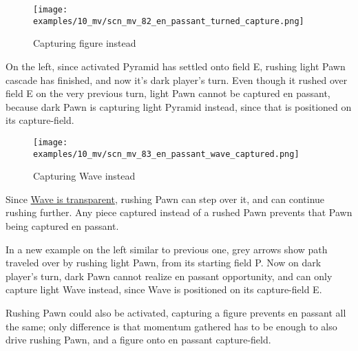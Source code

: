 \clearpage %

\vspace*{-2.1\baselineskip}
\noindent
\begin{wrapfigure}[11]{l}{0.4\textwidth}
\centering
\texttt{[image: examples/10\_mv/scn\_mv\_82\_en\_passant\_turned\_capture.png]}
\vspace*{-1.4\baselineskip}
\caption{Capturing figure instead}
\label{fig:scn_mv_82_en_passant_turned_capture}
\end{wrapfigure}
On the left, since activated Pyramid has settled onto field E, rushing light Pawn
cascade has finished, and now it's dark player's turn.\newline
\indent
Even though it rushed over field E on the very previous turn, light Pawn cannot
be captured en passant, because dark Pawn is capturing light Pyramid instead,
since that is positioned on its capture-field.



\vspace*{1.7\baselineskip}
\noindent
\begin{wrapfigure}[13]{l}{0.4\textwidth}
\centering
\texttt{[image: examples/10\_mv/scn\_mv\_83\_en\_passant\_wave\_captured.png]}
\vspace*{-1.4\baselineskip}
\caption{Capturing Wave instead}
\label{fig:scn_mv_83_en_passant_wave_captured}
\end{wrapfigure}
Since \hyperref[fig:scn_mv_07_wave_is_transparent]{Wave is transparent}, rushing
Pawn can step over it, and can continue rushing further. Any piece captured instead
of a rushed Pawn prevents that Pawn being captured en passant.

In a new example on the left similar to previous one, grey arrows show path traveled
over by rushing light Pawn, from its starting field P. Now on dark player's turn,
dark Pawn cannot realize en passant opportunity, and can only capture light Wave
instead, since Wave is positioned on its capture-field E.

Rushing Pawn could also be activated, capturing a figure prevents en passant all
the same; only difference is that momentum gathered has to be enough to also drive
rushing Pawn, and a figure onto en passant capture-field.

